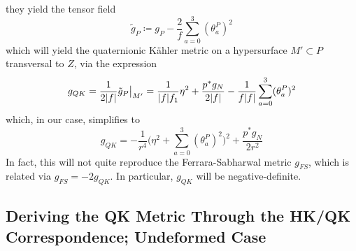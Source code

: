 they yield the tensor field 
\begin{equation*}
	\tilde g_P\coloneqq g_P-\frac{2}{f}\sum_{a=0}^3 (\theta^P_a)^2
\end{equation*}
which will yield the quaternionic K\"ahler metric on a hypersurface $M'\subset P$ transversal to $Z$, via the expression
\begin{equation}
	g_{QK}=\frac{1}{2\lvert f \rvert}\tilde g_P\big|_{M'}
	=\frac{1}{\lvert f \rvert f_1}\eta^2+\frac{p^*g_N}{2\lvert f \rvert}-\frac{1}{f\lvert f \rvert}\sum_{a=0}^3(\theta^P_a)^2
\end{equation}
which, in our case, simplifies to
\begin{equation}\label{eq:gQKspecific}
	g_{QK}=-\frac{1}{r^4}\Big(\eta^2+\sum_{a=0}^3(\theta^P_a)^2\Big)^2+\frac{p^*g_N}{2r^2}
\end{equation}
In fact, this will not quite reproduce the Ferrara-Sabharwal metric $g_{FS}$, which is related via $g_{FS}=-2g_{QK}$. In particular, $g_{QK}$ will be negative-definite.

\subsection{Deriving the QK Metric Through the HK/QK Correspondence; Undeformed Case}\label{sec:undeformedFSderivation}

